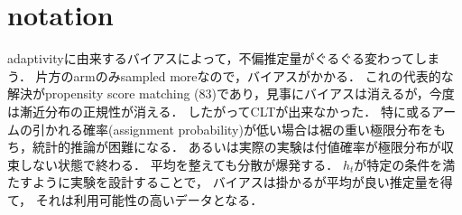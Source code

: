 \documentclass[uplatex,dvipdfmx]{jsreport}
\begin{document}
\section{notation}

\begin{tcolorbox}[colframe=ForestGreen, colback=ForestGreen!10!white,breakable,colbacktitle=ForestGreen!40!white,coltitle=black,fonttitle=\bfseries\sffamily,
title=RosenbaumとRubinを超えていく]
    adaptivityに由来するバイアスによって，不偏推定量がぐるぐる変わってしまう．
    片方のarmのみsampled moreなので，バイアスがかかる．
    これの代表的な解決がpropensity score matching (83)であり，見事にバイアスは消えるが，今度は漸近分布の正規性が消える．
    したがってCLTが出来なかった．
    特に或るアームの引かれる確率(assignment probability)が低い場合は裾の重い極限分布をもち，統計的推論が困難になる．
    あるいは実際の実験は付値確率が極限分布が収束しない状態で終わる．
    平均を整えても分散が爆発する．
    $h_t$が特定の条件を満たすように実験を設計することで，
    バイアスは掛かるが平均が良い推定量を得て，
    それは利用可能性の高いデータとなる．
\end{tcolorbox}
\end{document}
